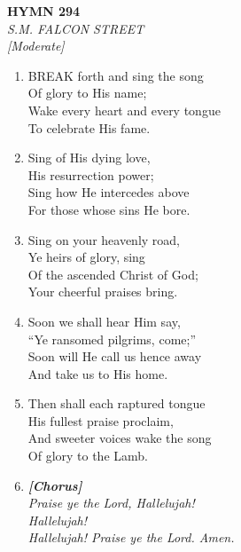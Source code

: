\documentclass[11pt,a4paper]{article}
\begin{document}
\newpage
\begin{center}
    {\Large \textbf{HYMN 294}}
    \\
    \textit{S.M. FALCON STREET}
    \\
    \textit{\small [Moderate]}
\end{center}
\vspace{1em}

\begin{enumerate}
    \item BREAK forth and sing the song \\
        Of glory to His name; \\
        Wake every heart and every tongue \\
        To celebrate His fame.

    \item Sing of His dying love, \\
        His resurrection power; \\
        Sing how He intercedes above \\
        For those whose sins He bore.

    \item Sing on your heavenly road, \\
        Ye heirs of glory, sing \\
        Of the ascended Christ of God; \\
        Your cheerful praises bring.

    \item Soon we shall hear Him say, \\
        ``Ye ransomed pilgrims, come;'' \\
        Soon will He call us hence away \\
        And take us to His home.

    \item Then shall each raptured tongue \\
        His fullest praise proclaim, \\
        And sweeter voices wake the song \\
        Of glory to the Lamb.

    \item[] \vspace{0.4em}
    \textbf{\textit{[Chorus]}} \\
    \textit{Praise ye the Lord, Hallelujah!} \\
    \textit{Hallelujah!} \\
    \textit{Hallelujah! Praise ye the Lord. Amen.}
    \vspace{0.4em}

\end{enumerate}
\end{document}
